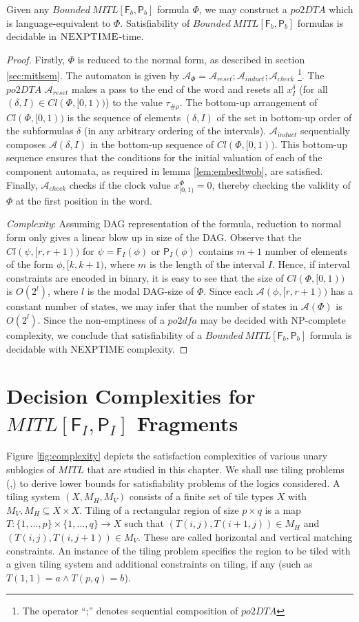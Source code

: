 \documentclass{llncs}
\newcommand{\class}{\textsc}
\newcommand{\fut}{\textsf{F}}
\newcommand{\past}{\textsf{P}}
\newcommand{\POTDFA}{\mbox{$\mathit{po2dfa}$}}
\newcommand{\mitlfp}{\mbox{$\mathit{MITL[\fut_I,\past_I]}$}}
\newcommand{\bmitlfp}{\mbox{$\mathit{Bounded ~MITL[\fut_b,\past_b]}$}}
\newcommand{\potdta}{\mbox{$\mathit{po2DTA}$}}
\newcommand{\autm}{\mathcal A}
\newcommand{\potdfa}{\POTDFA}
\newcommand{\mitlfpb}{\bmitlfp}
\newcommand{\mitl}{\mbox{$\mathit{MITL}$}}
\newcommand{\nexp}{\mbox{$\class{NEXPTIME}$}}
\begin{document}
\begin{theorem}
Given any \mitlfpb\/ formula $\Phi$, we may construct a \potdta\/ which is language-equivalent to $\Phi$. Satisfiability of \mitlfpb\/ formulas is decidable in \nexp-time.
\end{theorem}
\begin{proof}
Firstly, $\Phi$ is reduced to the normal form, as described in section \ref{sec:mitlsem}. The automaton is given by $\autm_\Phi = \autm_{reset};\autm_{induct};\autm_{check}$ \footnote{The operator ``;'' denotes sequential composition of \potdta}.  The \potdta\/ $\autm_{reset}$ makes a pass to the end of the word and resets all $x^\delta_I$ (for all $(\delta,I)\in Cl(\Phi,[0,1))$) to the value $\tau_{\#\rho}$. The bottom-up arrangement of $Cl(\Phi,[0,1))$ is the sequence of elements $(\delta,I)$ of the set in bottom-up order of the subformulas $\delta$ (in any arbitrary ordering of the intervals). $\autm_{induct}$ sequentially composes $\autm(\delta,I)$ in the bottom-up sequence of $Cl(\Phi,[0,1))$. This bottom-up sequence ensures that the conditions for the initial valuation of each of the component automata, as required in lemma \ref{lem:embedtwob}, are satisfied.
Finally, $\autm_{check}$ checks if the clock value $x^\Phi_{[0,1)}=0$, thereby checking the validity of $\Phi$ at the first position in the word. 

\noindent
\emph{Complexity}: Assuming DAG representation of the formula, reduction to normal form only gives a linear blow up in size of the DAG. Observe that the $Cl(\psi,[r,r+1))$  for $\psi=\fut_I (\phi)$ or  $\past_I(\phi)$ contains $m+1$ number of elements of the form $\phi,[k,k+1)$, where $m$ is the length of the interval $I$. Hence, if interval constraints are encoded in binary, it is easy to see that the size of $Cl(\Phi,[0,1))$ is $O(2^l)$, where $l$ is the modal DAG-size of $\Phi$. 
Since each  $\autm(\phi,[r,r+1))$ has a constant number of states, we may infer that the number of states in $\autm(\Phi)$ is $O(2^l)$. 
Since the non-emptiness of a \potdfa\/ may be decided with NP-complete complexity, we conclude that satisfiability of a \mitlfpb\/ formula is decidable with NEXPTIME complexity. 
\end{proof}


\section{Decision Complexities for \mitlfp\/ Fragments}
Figure \ref{fig:complexity} depicts the satisfaction complexities of various unary sublogics of \mitl\/ that are studied in this chapter.
We shall use tiling problems (\cite{vEB97},\cite{Fur83}) to derive lower bounds for satisfiability problems of the logics considered.
A tiling system $(X,M_H,M_V)$  consists of a finite set of tile types $X$ 
with $M_V,M_H \subseteq X \times X$.  Tiling of a rectangular region of size 
$p \times q$ is a map $T:\{1, \ldots, p\} \times \{1, \ldots, q\} \rightarrow X$ 
such that $(T(i,j),T(i+1,j)) \in M_H$ and $(T(i,j),T(i,j+1)) \in M_V$. These are called 
horizontal and vertical matching constraints. An instance of the tiling problem 
specifies the region to be tiled  with a given tiling system and additional 
constraints on tiling, if any (such as $T(1,1) = a \land T(p,q)=b$).
\end{document}
